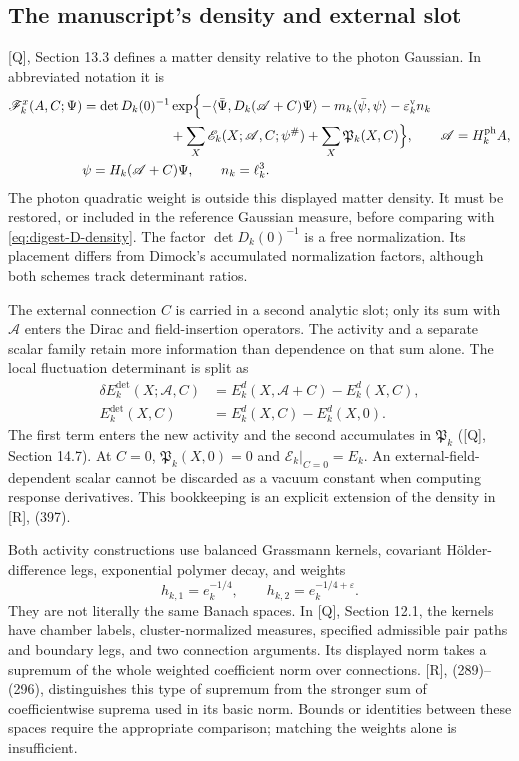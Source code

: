 \documentclass[11pt]{article}
\numberwithin{equation}{section}
\newcommand{\Q}{\textup{[Q]}}
\newcommand{\UR}{\textup{[R]}}
\begin{document}
\subsection{The manuscript's density and external slot}

\Q, Section 13.3 defines a matter density relative to the photon
Gaussian. In abbreviated notation it is
\begin{align}
 \mathscr F_k^x(A,C;\Psi)
 &=\det D_k(0)^{-1}\exp\Bigl\{
      -\langle\bar\Psi,D_k(\mathscr A+C)\Psi\rangle
      -m_k\langle\bar\psi,\psi\rangle
      -\varepsilon_k^{\mathrm v}n_k\notag\\
 &\hspace{23mm}
      +\sum_X\mathscr E_k(X;\mathscr A,C;\psi^\#)
      +\sum_X\mathfrak P_k(X,C)\Bigr\},\qquad
      \mathscr A=H_k^{\mathrm{ph}}A,
 \label{eq:digest-Q-density}\\
 &\psi=H_k(\mathscr A+C)\Psi,\qquad n_k=\ell_k^3.\notag
\end{align}
The photon quadratic weight is outside this displayed matter
density. It must be restored, or included in the reference Gaussian
measure, before comparing with \eqref{eq:digest-D-density}.
The factor $\det D_k(0)^{-1}$ is a free normalization. Its placement
differs from Dimock's accumulated normalization factors, although
both schemes track determinant ratios.

The external connection $C$ is carried in a second analytic slot;
only its sum with $\mathscr A$ enters the Dirac and field-insertion
operators. The activity and a separate scalar family retain more
information than dependence on that sum alone. The local fluctuation
determinant is split as
\begin{align}
 \delta E_k^{\mathrm{det}}(X;\mathscr A,C)
   &=E_k^d(X,\mathscr A+C)-E_k^d(X,C),\\
 E_k^{\mathrm{det}}(X,C)&=E_k^d(X,C)-E_k^d(X,0).
 \label{eq:digest-source-split}
\end{align}
The first term enters the new activity and the second accumulates
in $\mathfrak P_k$ (\Q, Section 14.7). At $C=0$,
$\mathfrak P_k(X,0)=0$ and $\mathscr E_k|_{C=0}=E_k$.
An external-field-dependent scalar cannot be discarded as a vacuum
constant when computing response derivatives. This bookkeeping is
an explicit extension of the density in \UR, (397).

Both activity constructions use balanced Grassmann kernels,
covariant H\"older-difference legs, exponential polymer decay, and
weights
\begin{equation}
 h_{k,1}=e_k^{-1/4},\qquad h_{k,2}=e_k^{-1/4+\varepsilon}.
\end{equation}
They are not literally the same Banach spaces. In \Q, Section 12.1,
the kernels have chamber labels, cluster-normalized measures,
specified admissible pair paths and boundary legs, and two connection
arguments. Its displayed norm takes a supremum of the whole weighted
coefficient norm over connections. \UR, (289)--(296), distinguishes
this type of supremum from the stronger sum of coefficientwise
suprema used in its basic norm. Bounds or identities between these
spaces require the appropriate comparison; matching the weights
alone is insufficient.
\end{document}
